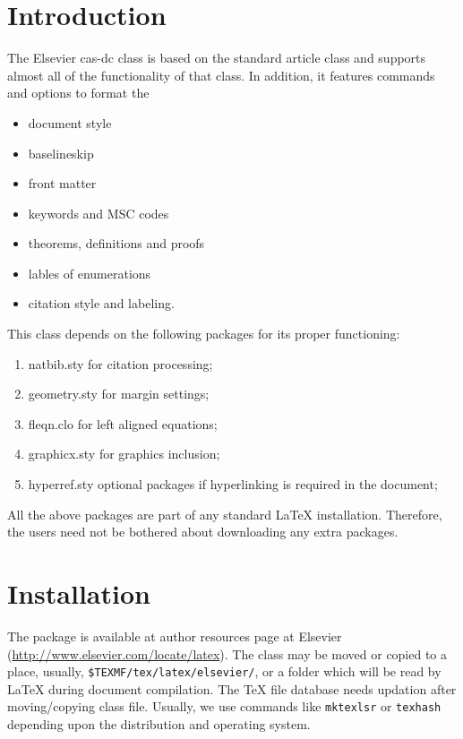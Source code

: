 \documentclass[a4paper,fleqn]{cas-dc}
\begin{document}
\section{Introduction}

The Elsevier cas-dc class is based on the
standard article class and supports almost all of the functionality of
that class. In addition, it features commands and options to format the
\begin{itemize} \item document style \item baselineskip \item front
matter \item keywords and MSC codes \item theorems, definitions and
proofs \item lables of enumerations \item citation style and labeling.
\end{itemize}

This class depends on the following packages
for its proper functioning:

\begin{enumerate}
\itemsep=0pt
\item {natbib.sty} for citation processing;
\item {geometry.sty} for margin settings;
\item {fleqn.clo} for left aligned equations;
\item {graphicx.sty} for graphics inclusion;
\item {hyperref.sty} optional packages if hyperlinking is
  required in the document;
\end{enumerate}  

All the above packages are part of any
standard \LaTeX{} installation.
Therefore, the users need not be
bothered about downloading any extra packages.

\section{Installation}

The package is available at author resources page at Elsevier
(\url{http://www.elsevier.com/locate/latex}).
The class may be moved or copied to a place, usually,\linebreak
\verb+$TEXMF/tex/latex/elsevier/+, %
or a folder which will be read                   
by \LaTeX{} during document compilation.  The \TeX{} file
database needs updation after moving/copying class file.  Usually,
we use commands like \verb+mktexlsr+ or \verb+texhash+ depending
upon the distribution and operating system.
\end{document}
